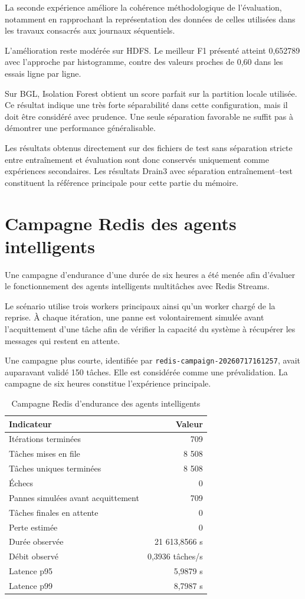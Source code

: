 La seconde expérience améliore la cohérence méthodologique de l'évaluation, notamment en rapprochant la représentation des données de celles utilisées dans les travaux consacrés aux journaux séquentiels.

L'amélioration reste modérée sur HDFS. Le meilleur F1 présenté atteint 0,652789 avec l'approche par histogramme, contre des valeurs proches de 0,60 dans les essais ligne par ligne.

Sur BGL, Isolation Forest obtient un score parfait sur la partition locale utilisée. Ce résultat indique une très forte séparabilité dans cette configuration, mais il doit être considéré avec prudence. Une seule séparation favorable ne suffit pas à démontrer une performance généralisable.

Les résultats obtenus directement sur des fichiers de test sans séparation stricte entre entraînement et évaluation sont donc conservés uniquement comme expériences secondaires. Les résultats Drain3 avec séparation entraînement--test constituent la référence principale pour cette partie du mémoire.

\section{Campagne Redis des agents intelligents}

Une campagne d'endurance d'une durée de six heures a été menée afin d'évaluer le fonctionnement des agents intelligents multitâches avec Redis Streams.

Le scénario utilise trois workers principaux ainsi qu'un worker chargé de la reprise. À chaque itération, une panne est volontairement simulée avant l'acquittement d'une tâche afin de vérifier la capacité du système à récupérer les messages qui restent en attente.

Une campagne plus courte, identifiée par \texttt{redis-campaign-20260717161257}, avait auparavant validé 150 tâches. Elle est considérée comme une prévalidation. La campagne de six heures constitue l'expérience principale.

\begin{table}[H]
\centering
\caption{Campagne Redis d'endurance des agents intelligents}
\label{tab:intelligent-redis-long}
\scriptsize

\begin{tabular}{lr}
\toprule
\textbf{Indicateur} &
\textbf{Valeur}
\tabularnewline
\midrule

Itérations terminées & 709 \tabularnewline
Tâches mises en file & 8 508 \tabularnewline
Tâches uniques terminées & 8 508 \tabularnewline
Échecs & 0 \tabularnewline
Pannes simulées avant acquittement & 709 \tabularnewline
Tâches finales en attente & 0 \tabularnewline
Perte estimée & 0 \tabularnewline
Durée observée & 21 613,8566 s \tabularnewline
Débit observé & 0,3936 tâches/s \tabularnewline
Latence p95 & 5,9879 s \tabularnewline
Latence p99 & 8,7987 s \tabularnewline

\bottomrule
\end{tabular}
\end{table}

